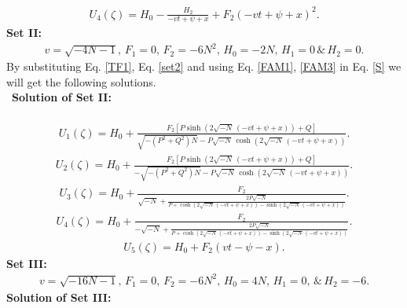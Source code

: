\documentclass{article}
\numberwithin{equation}{section}
\begin{document}
\begin{eqnarray}\label{U4}
U_{4}\left(\zeta \right) =H_{0}-\frac{H_{2}}{-v t +\psi +x}+F_{2} \left(-v t +\psi +x \right)^{2}.
\end{eqnarray}
\textbf{Set II:}
\begin{eqnarray}\label{set2}
v = \sqrt{-4 N -1},\,F_{1} = 0,\,F_{2} = -6 N^{2},\, H_{0} = -2 N,\, H_{1} = 0\,{\&}\, H_{2} = 0.
\end{eqnarray}
By substituting Eq. \ref{TF1}, Eq. \ref{set2} and using Eq. \ref{FAM1}, \ref{FAM3} in Eq. \ref{S} we will get the following solutions.\\\
\textbf{Solution of Set II:}\\\
\begin{eqnarray}\label{U11}
U_{1}\! \left(\zeta \right) =H_{0}+\frac{F_{2} \left[P \sinh \! \left(2 \sqrt{-N}\, \left(-v t +\psi +x \right)\right)+Q \right]}{\sqrt{-\left(P^{2}+Q^{2}\right) N}-P \sqrt{-N}\, \cosh \! \left(2 \sqrt{-N}\, \left(-v t +\psi +x \right)\right)}.
\end{eqnarray}
\begin{eqnarray}\label{U22}
U_{2}\! \left(\zeta \right) =H_{0}+\frac{F_{2} \left[P \sinh \! \left(2 \sqrt{-N}\, \left(-v t +\psi +x \right)\right)+Q \right]}{-\sqrt{-\left(P^{2}+Q^{2}\right) N}-P \sqrt{-N}\, \cosh \! \left(2 \sqrt{-N}\, \left(-v t +\psi +x \right)\right)}.
\end{eqnarray}
\begin{eqnarray}\label{U33}
U_{3}\! \left(\zeta \right) =H_{0}+\frac{F_{2}}{\sqrt{-N}+\frac{2 P \sqrt{-N}}{P +\cosh \left(2 \sqrt{-N}\, \left(-v t +\psi +x \right)\right)-\sinh \left(2 \sqrt{-N}\, \left(-v t +\psi +x \right)\right)}}.
\end{eqnarray}
\begin{eqnarray}\label{U44}
U_{4}\! \left(\zeta \right) =H_{0}+\frac{F_{2}}{-\sqrt{-N}+\frac{2 P \sqrt{-N}}{P +\cosh \left(2 \sqrt{-N}\, \left(-v t +\psi +x \right)\right)-\sinh \left(2 \sqrt{-N}\, \left(-v t +\psi +x \right)\right)}}.
\end{eqnarray}
\begin{eqnarray}\label{U55}
U_{5}\! \left(\zeta \right) = H_{0}+F_{2} \left(v t -\psi -x \right).
\end{eqnarray}
\textbf{Set III:}
\begin{eqnarray}\label{set3}
v = \sqrt{-16 N -1},\,F_{1} = 0,\,F_{2} = -6 N^{2},\, H_{0} = 4 N,\, H_{1} = 0,\,{\&}\, H_{2} = -6.
\end{eqnarray}
\textbf{Solution of Set III:}\\
\end{document}
